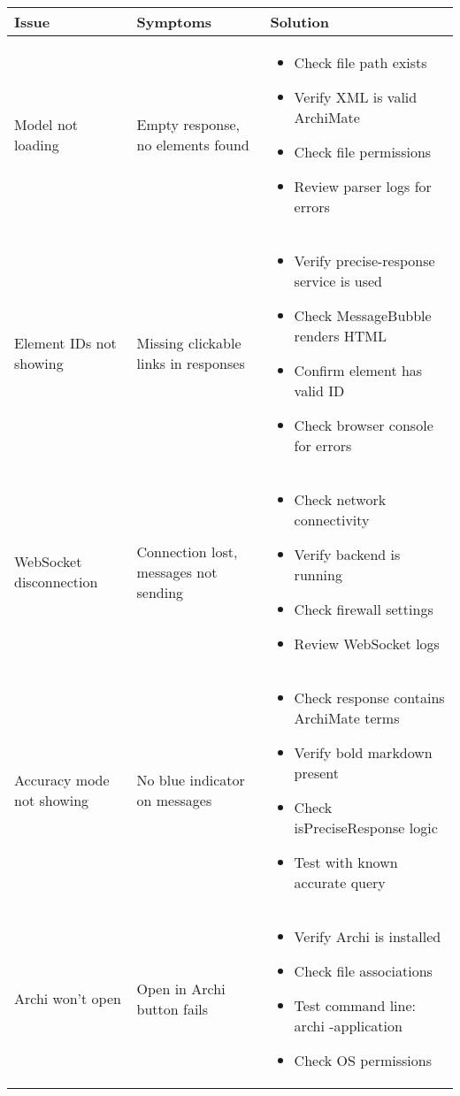 \documentclass[12pt,a4paper]{report}
\begin{document}
\begin{longtable}{|p{4cm}|p{4cm}|p{6cm}|}
\hline
\textbf{Issue} & \textbf{Symptoms} & \textbf{Solution} \\
\hline
\endhead
Model not loading & Empty response, no elements found &
\begin{itemize}
    \item Check file path exists
    \item Verify XML is valid ArchiMate
    \item Check file permissions
    \item Review parser logs for errors
\end{itemize} \\
\hline
Element IDs not showing & Missing clickable links in responses &
\begin{itemize}
    \item Verify precise-response service is used
    \item Check MessageBubble renders HTML
    \item Confirm element has valid ID
    \item Check browser console for errors
\end{itemize} \\
\hline
WebSocket disconnection & Connection lost, messages not sending &
\begin{itemize}
    \item Check network connectivity
    \item Verify backend is running
    \item Check firewall settings
    \item Review WebSocket logs
\end{itemize} \\
\hline
Accuracy mode not showing & No blue indicator on messages &
\begin{itemize}
    \item Check response contains ArchiMate terms
    \item Verify bold markdown present
    \item Check isPreciseResponse logic
    \item Test with known accurate query
\end{itemize} \\
\hline
Archi won't open & Open in Archi button fails &
\begin{itemize}
    \item Verify Archi is installed
    \item Check file associations
    \item Test command line: archi -application
    \item Check OS permissions
\end{itemize} \\
\hline
\end{longtable}
\end{document}
